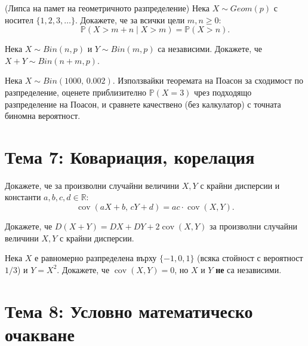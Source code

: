\begin{probbox}[Задача 6.1]
(Липса на памет на геометричното разпределение) Нека $X\sim Geom(p)$
с носител $\{1,2,3,\dots\}$. Докажете, че за всички цели $m,n\ge0$:
\[
  \mathbb P(X>m+n \mid X>m) = \mathbb P(X>n).
\]
\end{probbox}

\begin{probbox}[Задача 6.2]
Нека $X\sim Bin(n,p)$ и $Y\sim Bin(m,p)$ са независими. Докажете, че
$X+Y\sim Bin(n+m,p)$.
\end{probbox}

\begin{probbox}[Задача 6.3]
Нека $X\sim Bin(1000,\,0.002)$. Използвайки теоремата на Поасон за
сходимост по разпределение, оценете приблизително $\mathbb P(X=3)$
чрез подходящо разпределение на Поасон, и сравнете качествено
(без калкулатор) с точната биномна вероятност.
\end{probbox}

\section*{Тема 7: Ковариация, корелация}

\begin{probbox}[Задача 7.1]
Докажете, че за произволни случайни величини $X,Y$ с крайни
дисперсии и константи $a,b,c,d\in\mathbb R$:
\[
  \operatorname{cov}(aX+b,\,cY+d) = ac\cdot\operatorname{cov}(X,Y).
\]
\end{probbox}

\begin{probbox}[Задача 7.2]
Докажете, че $D(X+Y) = DX+DY+2\operatorname{cov}(X,Y)$ за произволни
случайни величини $X,Y$ с крайни дисперсии.
\end{probbox}

\begin{probbox}[Задача 7.3]
Нека $X$ е равномерно разпределена върху $\{-1,0,1\}$ (всяка стойност
с вероятност $1/3$) и $Y=X^2$. Докажете, че $\operatorname{cov}(X,Y)=0$,
но $X$ и $Y$ \textbf{не} са независими.
\end{probbox}

\section*{Тема 8: Условно математическо очакване}

